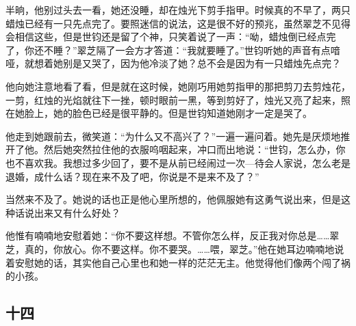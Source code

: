\par 半晌，他别过头去一看，她还没睡，却在烛光下剪手指甲。时候真的不早了，两只蜡烛已经有一只先点完了。要照迷信的说法，这是很不好的预兆，虽然翠芝不见得会相信这些，但是世钧还是留了个神，只笑着说了一声：“呦，蜡烛倒已经点完了，你还不睡？”翠芝隔了一会方才答道：“我就要睡了。”世钧听她的声音有点喑哑，就想着她别是又哭了，因为他冷淡了她？总不会是因为有一只蜡烛先点完？
\par 他向她注意地看了看，但是就在这时候，她刚巧用她剪指甲的那把剪刀去剪烛花，一剪，红烛的光焰就往下一挫，顿时眼前一黑，等到剪好了，烛光又亮了起来，照在她脸上，她的脸色已经是很平静的。但是世钧知道她刚才一定是哭了。
\par 他走到她跟前去，微笑道：“为什么又不高兴了？”一遍一遍问着。她先是厌烦地推开了他。然后她突然拉住他的衣服呜咽起来，冲口而出地说：“世钧，怎么办，你也不喜欢我。我想过多少回了，要不是从前已经闹过一次—待会人家说，怎么老是退婚，成什么话？现在来不及了吧，你说是不是来不及了？”
\par 当然来不及了。她说的话也正是他心里所想的，他佩服她有这勇气说出来，但是这种话说出来又有什么好处？
\par 他惟有喃喃地安慰着她：“你不要这样想。不管你怎么样，反正我对你总是……翠芝，真的，你放心。你不要这样。你不要哭。……喂，翠芝。”他在她耳边喃喃地说着安慰她的话，其实他自己心里也和她一样的茫茫无主。他觉得他们像两个闯了祸的小孩。


\subsection{十四}

